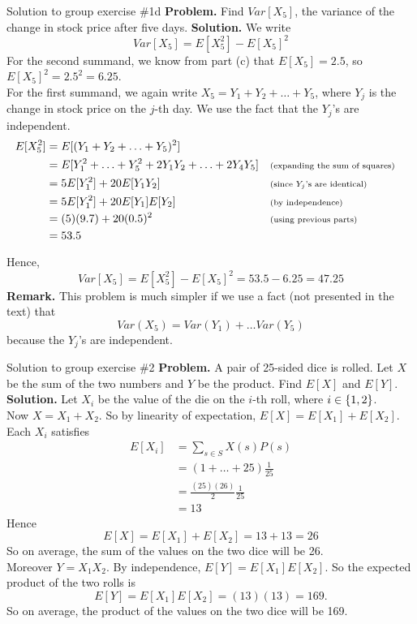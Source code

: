\documentclass[10pt]{beamer}
\begin{document}
\begin{frame}{Solution to group exercise \#1d}
\footnotesize
\textbf{Problem.}  Find $Var[X_5]$, the variance of the change in stock price after five days. 
\vfill \vfill 
\textbf{Solution.}   We write
  \[ Var[X_5] = E[X_5^2] - E[X_5]^2 \]
  For the second summand, we know from part (c) that $E[X_5] = 2.5$, so $ E[X_5]^2 = 2.5^2 = 6.25$. \\
   \vfill 
   For the first summand, we again write $X_5 = Y_1 + Y_2 + \hdots + Y_5$, where $Y_j$ is the change in stock price on the $j$-th day.  We use the fact that the $Y_j$'s are independent.
   \begin{align*}
   E[X_5^2] &= E[(Y_1 + Y_2 + \hdots + Y_5)^2] \\
   &=E[Y_1^2 + \hdots + Y_5^2 + 2Y_1Y_2 + \hdots +2Y_4Y_5] && \text{\scriptsize{{(expanding the sum of squares)}}}\\
   &= 5E[Y_1^2] + 20E[Y_1Y_2] && \text{\scriptsize{{(since $Y_j$'s are identical)}}}\\
   &= 5E[Y_1^2] + 20E[Y_1]E[Y_2]  && \text{\scriptsize{{(by independence)}}}\\
   &= (5)(9.7)  + 20(0.5)^2 && \text{\scriptsize{{(using previous parts)}}}\\
   &= 53.5
   \end{align*}

Hence,
  \[ Var[X_5] = E[X_5^2] - E[X_5]^2 = 53.5 - 6.25 = 47.25 \]
\vfill \vfill 
\textbf{Remark.} This problem is much simpler if we use a fact (not presented in the text) that 
\[ Var(X_5) = Var(Y_1) + \hdots Var(Y_5)\]
because the $Y_j$'s are independent.
\end{frame}



\begin{frame}{Solution to group exercise \#2}
\footnotesize 
\textbf{Problem.} A pair of 25-sided dice is rolled. Let $X$ be the sum of the two numbers and $Y$ be the product. Find $E[X]$ and $E[Y]$.
\vfill 
\textbf{Solution.} Let $X_i$ be the value of the die on the $i$-th roll, where $i \in \{ {1,2} \}$.   \\

Now $X=X_1+X_2$. So by linearity of expectation, $E[X]=E[X_1]+E[X_2]$.  Each $X_i$ satisfies
%
\begin{align*}
E[X_i] &= \sum_{s \in S} X(s) P(s) \\
&= (1+\hdots + 25) \frac{1}{25} \\
&= \frac{(25)(26)}{2} \frac{1}{25} \\
&=13
\end{align*}
Hence
\[E[X]=E[X_1]+E[X_2] = 13+13 =26 \]
So on average, the sum of the values on the two dice will be 26. \\
\vfill 
Moreover $Y=X_1 X_2$. By independence, $E[Y] = E[X_1]E[X_2]$.  So the expected product of the two rolls is
\[E[Y]=E[X_1]E[X_2] = (13)(13) = 169. \]
So on average, the product of the values on the two dice will be 169. \\

\end{frame}
\end{document}
